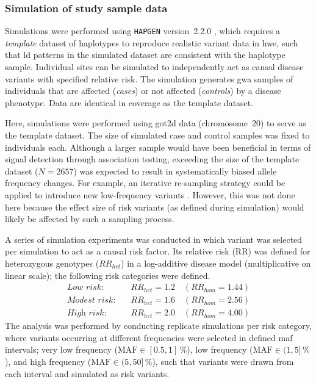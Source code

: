 %
\subsubsection{Simulation of study sample data}
%

Simulations were performed using \texttt{HAPGEN} version~2.2.0 \citep{Su:2011km}, which requires a \emph{template} dataset of haplotypes to reproduce realistic variant data in \gls{hwe}, such that \gls{ld} patterns in the simulated dataset are consistent with the haplotype sample.
Individual sites can be simulated to independently act as causal disease variants with specified relative risk.
The simulation generates  \gls{gwa} samples of individuals that are affected (\emph{cases}) or not affected (\emph{controls}) by a disease phenotype.
Data are identical in coverage as the template dataset.

Here, simulations were performed using \gls{got2d} data (chromosome~20) to serve as the template dataset.
The size of simulated case and control samples was fixed to  individuals each.
Although a larger sample would have been beneficial in terms of signal detection through association testing, exceeding the size of the template dataset (${N=\num{2657}}$) was expected to result in systematically biased allele frequency changes.
For example, an iterative re-sampling strategy could be applied to introduce new low-frequency variants \citep[\eg following][]{Moutsianas:2015jm}.
However, this was not done here because the effect size of risk variants (as defined during simulation) would likely be affected by such a sampling process.

A series of simulation experiments was conducted in which  variant was selected per simulation to act as a causal risk factor.
Its relative risk (RR) was defined for heterozygous genotypes ($RR_{het}$) in a log-additive disease model (\ie multiplicative on linear scale); the following  risk categories were defined.
\begin{align*}
	\textit{Low risk}     : & \quad {RR_{het}=1.2} \quad {(RR_{hom}=1.44)} \\
	\textit{Modest risk}  : & \quad {RR_{het}=1.6} \quad {(RR_{hom}=2.56)} \\
	\textit{High risk}    : & \quad {RR_{het}=2.0} \quad {(RR_{hom}=4.00)}
\end{align*}
The analysis was performed by conducting  replicate simulations per risk category, where variants occurring at different frequencies were selected in  defined \gls{maf} intervals;
very low frequency (${\text{MAF} \in [0.5, 1]\,\%}$), low frequency (${\text{MAF} \in (1, 5]\,\%}$), and high frequency (${\text{MAF} \in (5, 50]\,\%}$), such that  variants were drawn from each interval and simulated as risk variants.

